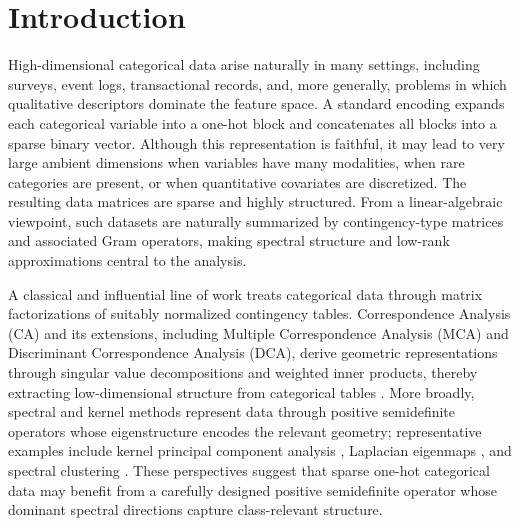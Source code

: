 \documentclass[preprint,11pt]{elsarticle}
\begin{document}


\section{Introduction}

High-dimensional categorical data arise naturally in many settings, including surveys, event logs, transactional records, and, more generally, problems in which qualitative descriptors dominate the feature space.
A standard encoding expands each categorical variable into a one-hot block and concatenates all blocks into a sparse binary vector.
Although this representation is faithful, it may lead to very large ambient dimensions when variables have many modalities, when rare categories are present, or when quantitative covariates are discretized.
The resulting data matrices are sparse and highly structured.
From a linear-algebraic viewpoint, such datasets are naturally summarized by contingency-type matrices and associated Gram operators, making spectral structure and low-rank approximations central to the analysis.

A classical and influential line of work treats categorical data through matrix factorizations of suitably normalized contingency tables.
Correspondence Analysis (CA) and its extensions, including Multiple Correspondence Analysis (MCA) and Discriminant Correspondence Analysis (DCA), derive geometric representations through singular value decompositions and weighted inner products, thereby extracting low-dimensional structure from categorical tables \cite{Greenacre1984,DCA}.
More broadly, spectral and kernel methods represent data through positive semidefinite operators whose eigenstructure encodes the relevant geometry; representative examples include kernel principal component analysis \cite{Scholkopf1998}, Laplacian eigenmaps \cite{BelkinNiyogi2003}, and spectral clustering \cite{NgJordanWeiss2002}.
These perspectives suggest that sparse one-hot categorical data may benefit from a carefully designed positive semidefinite operator whose dominant spectral directions capture class-relevant structure.
\end{document}
